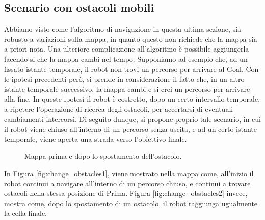 \documentclass[english]{article}
\begin{document}
\subsection{Scenario con ostacoli mobili}
Abbiamo visto come l'algoritmo di navigazione in questa ultima sezione, sia robusto a variazioni sulla mappa, in quanto questo non richiede che la mappa sia a priori nota. Una ulteriore complicazione all'algoritmo è possibile aggiungerla facendo si che la mappa cambi nel tempo. Supponiamo ad esempio che, ad un fissato istante temporale, il robot non trovi un percorso per arrivare al Goal. Con le ipotesi precedenti però, si prende in considerazione il fatto che, in un altro istante temporale successivo, la mappa cambi e si crei un percorso per arrivare alla fine. In queste ipotesi il robot è costretto, dopo un certo intervallo temporale, a ripetere l'operazione di ricerca degli ostacoli, per accertarsi di eventuali cambiamenti intercorsi. Di seguito dunque, si propone proprio tale scenario, in cui il robot viene chiuso all'interno di un percorso senza uscita, e ad un certo istante temporale, viene aperta una strada verso l'obiettivo finale.
\begin{figure}[!ht]
\centering
{}
\caption{Mappa prima e dopo lo spostamento dell'ostacolo.}
\end{figure}
In Figura \ref{fig:change_obstacles1}, viene mostrato nella mappa come, all'inizio il robot continui a navigare all'interno di un percorso chiuso, e continui a trovare ostacoli nella stessa posizione di Prima. Figura \ref{fig:change_obstacles2} invece, mostra come, dopo lo spostamento di un ostacolo, il robot raggiunga ugualmente la cella finale.
\end{document}
